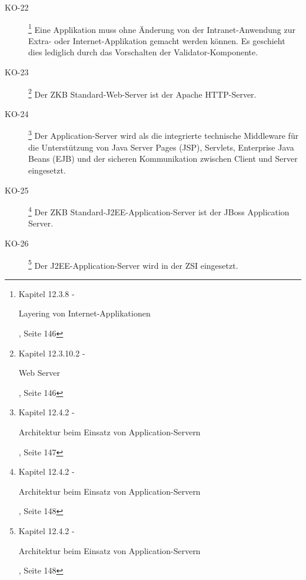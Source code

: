 \documentclass[
11pt, %
a4paper, %
BCOR25mm, %
DIV14, %
footsepline = false, %
headsepline, %
twoside, %
openright,
abstracton, %
listof=totocnumbered, %
bibliography=totocnumbered %
]{scrreprt}
\begin{document}
\begin{description}
    \item[KO-22\label{itm:KO-22}]
    \footnote{\cite{ZkbHandbuchDerItArchitektur} Kapitel 12.3.8 -
    \begin{itshape}Layering von Internet-Applikationen\end{itshape}, Seite 146}
    Eine Applikation muss ohne Änderung von der Intranet-Anwendung zur Extra-
    oder Internet-Applikation gemacht werden können. Es geschieht dies
    lediglich durch das Vorschalten der Validator-Komponente.
    
    \item[KO-23\label{itm:KO-23}]
    \footnote{\cite{ZkbHandbuchDerItArchitektur} Kapitel 12.3.10.2 -
    \begin{itshape}Web Server\end{itshape}, Seite 146}
    Der ZKB Standard-Web-Server ist der Apache HTTP-Server.
    
    \item[KO-24\label{itm:KO-24}]
    \footnote{\cite{ZkbHandbuchDerItArchitektur} Kapitel 12.4.2 -
    \begin{itshape}Architektur beim Einsatz von
    Application-Servern\end{itshape}, Seite 147}
    Der Application-Server wird als die integrierte technische Middleware für
    die Unterstützung von Java Server Pages (JSP), Servlets, Enterprise Java
    Beans (EJB) und der sicheren Kommunikation zwischen Client und Server
    eingesetzt.
    
    \item[KO-25\label{itm:KO-25}]
    \footnote{\cite{ZkbHandbuchDerItArchitektur} Kapitel 12.4.2 -
    \begin{itshape}Architektur beim Einsatz von
    Application-Servern\end{itshape}, Seite 148}
    Der ZKB Standard-J2EE-Application-Server ist der JBoss Application Server.
    
    \item[KO-26\label{itm:KO-26}]
    \footnote{\cite{ZkbHandbuchDerItArchitektur} Kapitel 12.4.2 -
    \begin{itshape}Architektur beim Einsatz von
    Application-Servern\end{itshape}, Seite 148}
    Der J2EE-Application-Server wird in der \ac{ZSI} eingesetzt.
    

\end{description}
\end{document}
